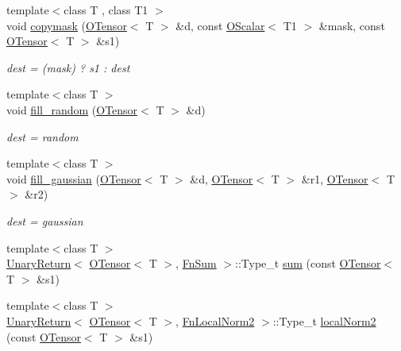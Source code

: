 \begin{DoxyCompactItemize}
{\footnotesize template$<$class T , class T1 $>$ }\\void \mbox{\hyperlink{group__obstensor_gaec447bbfae019c25fe1906a76108bff8}{copymask}} (\mbox{\hyperlink{classENSEM_1_1OTensor}{O\+Tensor}}$<$ T $>$ \&d, const \mbox{\hyperlink{classENSEM_1_1OScalar}{O\+Scalar}}$<$ T1 $>$ \&mask, const \mbox{\hyperlink{classENSEM_1_1OTensor}{O\+Tensor}}$<$ T $>$ \&s1)
\begin{DoxyCompactList}\small\item\em dest = (mask) ? s1 \+: dest \end{DoxyCompactList}\item 
{\footnotesize template$<$class T $>$ }\\void \mbox{\hyperlink{group__obstensor_ga7d63bb40d886b853e075aec1dea0a717}{fill\+\_\+random}} (\mbox{\hyperlink{classENSEM_1_1OTensor}{O\+Tensor}}$<$ T $>$ \&d)
\begin{DoxyCompactList}\small\item\em dest = random \end{DoxyCompactList}\item 
{\footnotesize template$<$class T $>$ }\\void \mbox{\hyperlink{group__obstensor_ga5461ae19cc6cfc4271fe13264bbda77d}{fill\+\_\+gaussian}} (\mbox{\hyperlink{classENSEM_1_1OTensor}{O\+Tensor}}$<$ T $>$ \&d, \mbox{\hyperlink{classENSEM_1_1OTensor}{O\+Tensor}}$<$ T $>$ \&r1, \mbox{\hyperlink{classENSEM_1_1OTensor}{O\+Tensor}}$<$ T $>$ \&r2)
\begin{DoxyCompactList}\small\item\em dest = gaussian \end{DoxyCompactList}\item 
{\footnotesize template$<$class T $>$ }\\\mbox{\hyperlink{structENSEM_1_1UnaryReturn}{Unary\+Return}}$<$ \mbox{\hyperlink{classENSEM_1_1OTensor}{O\+Tensor}}$<$ T $>$, \mbox{\hyperlink{structENSEM_1_1FnSum}{Fn\+Sum}} $>$\+::Type\+\_\+t \mbox{\hyperlink{group__obstensor_ga83a9795df4ff312d25e7971ff02b5e8b}{sum}} (const \mbox{\hyperlink{classENSEM_1_1OTensor}{O\+Tensor}}$<$ T $>$ \&s1)
\item 
{\footnotesize template$<$class T $>$ }\\\mbox{\hyperlink{structENSEM_1_1UnaryReturn}{Unary\+Return}}$<$ \mbox{\hyperlink{classENSEM_1_1OTensor}{O\+Tensor}}$<$ T $>$, \mbox{\hyperlink{structENSEM_1_1FnLocalNorm2}{Fn\+Local\+Norm2}} $>$\+::Type\+\_\+t \mbox{\hyperlink{group__obstensor_ga4d3ab927a59e8e7e944243bad78ea1fd}{local\+Norm2}} (const \mbox{\hyperlink{classENSEM_1_1OTensor}{O\+Tensor}}$<$ T $>$ \&s1)

\end{DoxyCompactItemize}
